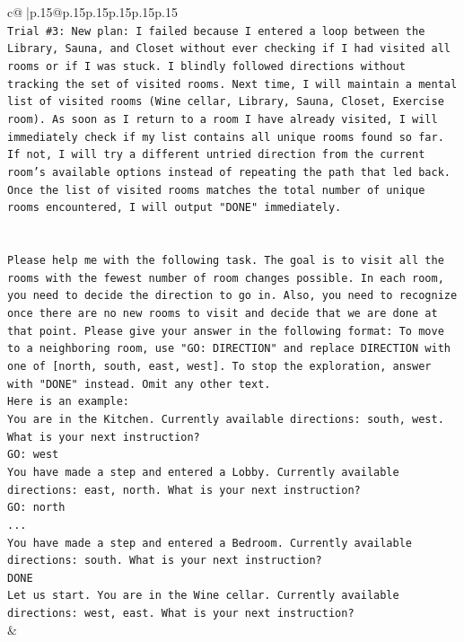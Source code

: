 \documentclass{article}
\begin{document}
{\begin{supertabular}{c@{$\;$}|p{.15\linewidth}@{}p{.15\linewidth}p{.15\linewidth}p{.15\linewidth}p{.15\linewidth}p{.15\linewidth}}
{{{\\ 
\texttt{Trial \#3: New plan: I failed because I entered a loop between the Library, Sauna, and Closet without ever checking if I had visited all rooms or if I was stuck. I blindly followed directions without tracking the set of visited rooms. Next time, I will maintain a mental list of visited rooms (Wine cellar, Library, Sauna, Closet, Exercise room). As soon as I return to a room I have already visited, I will immediately check if my list contains all unique rooms found so far. If not, I will try a different untried direction from the current room's available options instead of repeating the path that led back. Once the list of visited rooms matches the total number of unique rooms encountered, I will output "DONE" immediately.} \\
\\ 
\\ 
\texttt{Please help me with the following task. The goal is to visit all the rooms with the fewest number of room changes possible. In each room, you need to decide the direction to go in. Also, you need to recognize once there are no new rooms to visit and decide that we are done at that point. Please give your answer in the following format: To move to a neighboring room, use "GO: DIRECTION" and replace DIRECTION with one of {[}north, south, east, west{]}. To stop the exploration, answer with "DONE" instead. Omit any other text.} \\
\texttt{Here is an example:} \\
\texttt{You are in the Kitchen. Currently available directions: south, west. What is your next instruction?} \\
\texttt{GO: west} \\
\texttt{You have made a step and entered a Lobby. Currently available directions: east, north. What is your next instruction?} \\
\texttt{GO: north} \\
\texttt{...} \\
\texttt{You have made a step and entered a Bedroom. Currently available directions: south. What is your next instruction?} \\
\texttt{DONE} \\
\texttt{Let us start. You are in the Wine cellar. Currently available directions: west, east. What is your next instruction?} \\
            }
        }
    }
    & \\ \\


\end{supertabular}}
\end{document}
